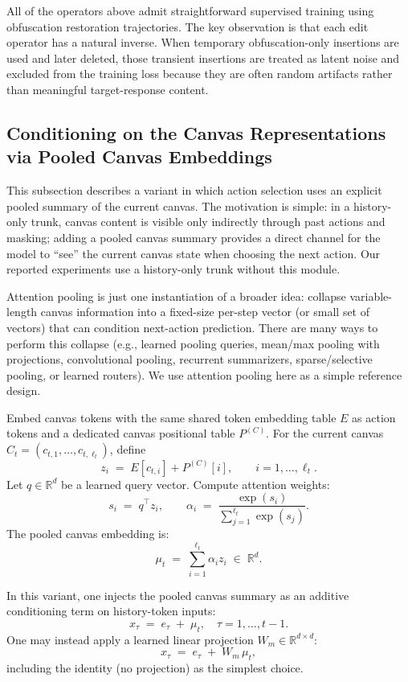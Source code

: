 \documentclass[11pt]{article}
\begin{document}
All of the operators above admit straightforward supervised training using obfuscation restoration trajectories. The key observation is that each edit operator has a natural inverse. When temporary obfuscation-only insertions are used and later deleted, those transient insertions are treated as latent noise and excluded from the training loss because they are often random artifacts rather than meaningful target-response content.\\


\subsection{Conditioning on the Canvas Representations via Pooled Canvas Embeddings}
\label{sec:pooling}

This subsection describes a variant in which action selection uses an explicit pooled summary of the current canvas. The motivation is simple: in a history-only trunk, canvas content is visible only indirectly through past actions and masking; adding a pooled canvas summary provides a direct channel for the model to ``see'' the current canvas state when choosing the next action. Our reported experiments use a history-only trunk without this module.

Attention pooling is just one instantiation of a broader idea: collapse variable-length canvas information into a fixed-size per-step vector (or small set of vectors) that can condition next-action prediction. There are many ways to perform this collapse (e.g., learned pooling queries, mean/max pooling with projections, convolutional pooling, recurrent summarizers, sparse/selective pooling, or learned routers). We use attention pooling here as a simple reference design.

Embed canvas tokens with the same shared token embedding table $E$ as action tokens and a dedicated canvas positional table $P^{(C)}$. For the current canvas $C_t=(c_{t,1},\dots,c_{t,\ell_t})$, define
\[
z_i \;=\; E[c_{t,i}] + P^{(C)}[i], \qquad i=1,\dots,\ell_t.
\]
Let $q \in \mathbb{R}^{d}$ be a learned query vector. Compute attention weights:
\[
s_i \;=\; q^\top z_i, \qquad
\alpha_i \;=\; \frac{\exp(s_i)}{\sum_{j=1}^{\ell_t}\exp(s_j)}.
\]
The pooled canvas embedding is:
\[
\mu_t \;=\; \sum_{i=1}^{\ell_t} \alpha_i z_i \;\in\; \mathbb{R}^{d}.
\]

In this variant, one injects the pooled canvas summary as an additive conditioning term on history-token inputs:
\[
x_\tau \;=\; e_\tau \;+\; \mu_t, \quad \tau=1,\dots,t-1.
\]
One may instead apply a learned linear projection $W_m \in \mathbb{R}^{d\times d}$:
\[
x_\tau \;=\; e_\tau \;+\; W_m\, \mu_t,
\]
including the identity (no projection) as the simplest choice.
\end{document}
